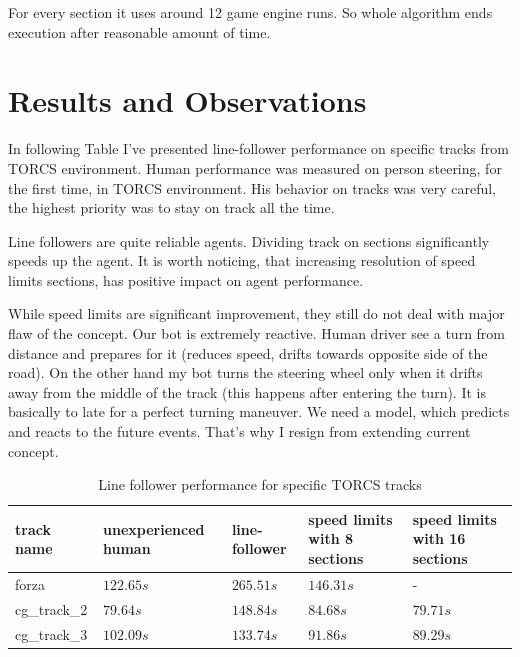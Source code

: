 \documentclass[declaration,shortabstract,english,inz]{iithesis}
\begin{document}
For every section it uses around 12 game engine runs.
So whole algorithm ends execution after reasonable amount of time.

\section{Results and Observations}

In following Table I've presented line-follower performance on specific tracks from TORCS environment. Human performance was measured on person steering, for the first time, in TORCS environment. His behavior on tracks was very careful, the highest priority was to stay on track all the time.

Line followers are quite reliable agents.
Dividing track on sections significantly speeds up the agent.
It is worth noticing, that increasing resolution of speed limits sections, has positive impact on agent performance.


While speed limits are significant improvement, they still do not deal with major flaw of the concept.
Our bot is extremely reactive.
Human driver see a turn from distance and prepares for it (reduces speed, drifts towards opposite side of the road).
On the other hand my bot turns the steering wheel only when it drifts away from the middle of the track (this happens after entering the turn).
It is basically to late for a perfect turning maneuver.
We need a model, which predicts and reacts to the  future events.
That's why I resign from extending current concept.


\begin{table}[h]
    \centering
    \begin{tabular}{ |p{1.7cm}|p{2.5cm}|p{2cm}|p{2.4cm}|p{2.4cm}|}
          \hline
          track name & unexperienced human & line-follower & speed limits with 8 sections & speed limits with 16 sections  \\
          \hline
          forza &  $122.65s$ & $265.51s$ & $146.31s$ & -  \\
          \hline
          cg\_track\_2 & $79.64s$ & $148.84s$ &  $84.68s$ & $79.71s$ \\ 

          \hline
          cg\_track\_3 & $102.09s$ & $133.74s$ & $91.86s$  & $89.29s$  \\
          \hline
    \end{tabular}
        \caption{Line follower performance for specific TORCS tracks}
        \label{tab:line_follower}

\end{table}
\end{document}
